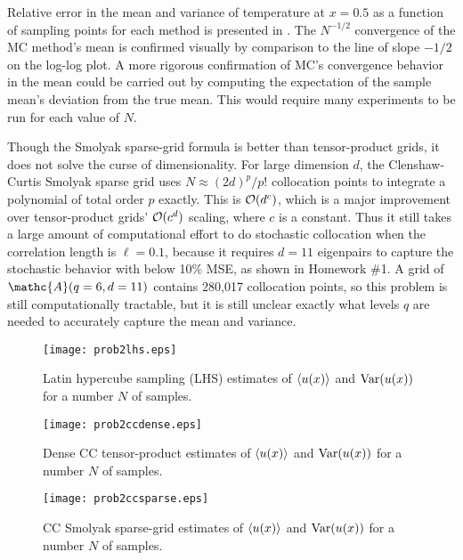 \documentclass[11pt]{article}
\begin{document}
Relative error in the mean and variance of temperature at $x = 0.5$ as a function of sampling points for each method is presented in . The $N^{-1/2}$ convergence of the MC method's mean is confirmed visually by comparison to the line of slope $-1/2$ on the log-log plot. A more rigorous confirmation of MC's convergence behavior in the mean could be carried out by computing the expectation of the sample mean's deviation from the true mean. This would require many experiments to be run for each value of $N$.

Though the Smolyak sparse-grid formula is better than tensor-product grids, it does not solve the curse of dimensionality. For large dimension $d$, the Clenshaw-Curtis Smolyak sparse grid uses $N \approx (2d)^p/p!$ collocation points to integrate a polynomial of total order $p$ exactly. This is $\mathcal{O}(d^c)$, which is a major improvement over tensor-product grids' $\mathcal{O}(c^d)$ scaling, where $c$ is a constant. Thus it still takes a large amount of computational effort to do stochastic collocation when the correlation length is $\ell = 0.1$, because it requires $d = 11$ eigenpairs to capture the stochastic behavior with below 10\% MSE, as shown in Homework \#1. A grid of $\mathc{A}(q=6,d=11)$ contains 280,017 collocation points, so this problem is still computationally tractable, but it is still unclear exactly what levels $q$ are needed to accurately capture the mean and variance.

\begin{figure}[h]
\centering
\texttt{[image: prob2lhs.eps]}
\\[2ex]
\caption{Latin hypercube sampling (LHS) estimates of $\left\langle u(x) \right\rangle$ and $\operatorname{Var}(u(x))$ for a number $N$ of samples.}
\label{fig:prob2_lhs}
\end{figure}

\begin{figure}[h]
\centering
\texttt{[image: prob2ccdense.eps]}
\\[2ex]
\caption{Dense CC tensor-product estimates of $\left\langle u(x) \right\rangle$ and $\operatorname{Var}(u(x))$ for a number $N$ of samples.}
\label{fig:prob2_dense}
\end{figure}

\begin{figure}[h]
\centering
\texttt{[image: prob2ccsparse.eps]}
\\[2ex]
\caption{CC Smolyak sparse-grid estimates of $\left\langle u(x) \right\rangle$ and $\operatorname{Var}(u(x))$ for a number $N$ of samples.}
\label{fig:prob2_sparse}
\end{figure}
\end{document}
